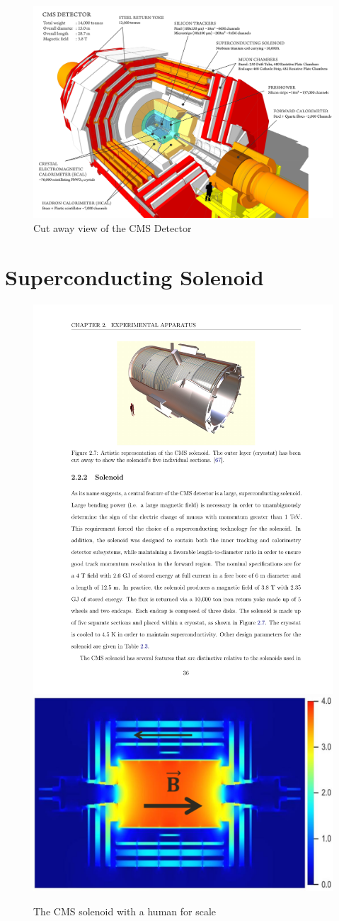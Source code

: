 \begin{figure}
\begin{center}
\includegraphics[width=.90\textwidth]{pics/cut_away_view}
\end{center}
\caption{Cut away view of the CMS Detector}
\label{fig:cms_onion}
\end{figure}



\section{Superconducting Solenoid}


\begin{figure}
\begin{center}
\includegraphics[width=.45\textwidth]{pics/solenoid_diagram}
\includegraphics[width=.45\textwidth]{pics/b_field}
\end{center}
\caption{The CMS solenoid with a human for scale}
\label{fig:solenoid_bfield}
\end{figure}

